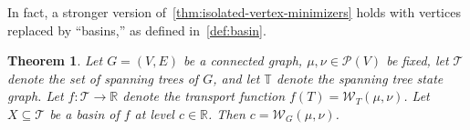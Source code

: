 \documentclass[10pt,a4paper]{amsart}
\newcommand{\prob}{{\mathscr{P}}}
\newcommand{\wass}{{\mathcal{W}}}
\newcommand{\setoftrees}{{\mathcal{T}}}
\newcommand{\stategraph}{{\mathbb{T}}}
\newcommand{\embedding}{{\mathsf{k}}}
\newcommand{\flowpoly}{{\mathcal{K}}}
\newtheorem{theorem}{Theorem}[section]
\begin{document}
 
In fact, a stronger version of~\cref{thm:isolated-vertex-minimizers} holds with vertices replaced by ``basins,'' as defined in~\cref{def:basin}. 

\begin{theorem}\label{thm:no-isolated-basins}
    Let $G=(V,E)$ be a connected graph, $\mu,\nu\in\prob(V)$ be fixed, let $\setoftrees$ denote the set of spanning trees of $G$, and let $\stategraph$ denote the spanning tree state graph. Let $f:\setoftrees\rightarrow\mathbb{R}$ denote the transport function $f(T) = \wass_T(\mu,\nu)$. Let $X\subseteq\setoftrees$ be a basin of $f$ at level $c\in\mathbb{R}$. Then $c = \wass_G(\mu,\nu)$.
\end{theorem}
\end{document}
